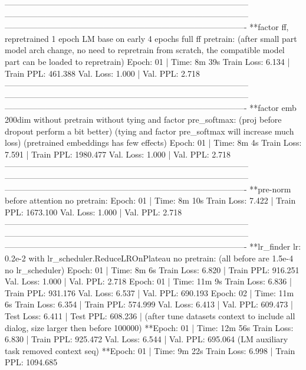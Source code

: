 \documentclass[letterpaper]{article} %
\begin{document}
\begin{CJK*}{UTF8}{gbsn}
-----------------------------------------------------------------------------------------
-----------------------------------------------------------------------------------------
----------------------------------------------------------------------------------------
**factor ff, repretrained 1 epoch LM base on early 4 epochs full ff pretrain:
(after small part model arch change, no need to repretrain from scratch,
the compatible model part can be loaded to repretrain)
Epoch: 01 | Time: 8m 39s
	Train Loss: 6.134 | Train PPL: 461.388
	 Val. Loss: 1.000 |  Val. PPL:   2.718
-----------------------------------------------------------------------------------------
-----------------------------------------------------------------------------------------
----------------------------------------------------------------------------------------
**factor emb 200dim without pretrain without tying and factor pre_softmax:
(proj before dropout perform a bit better)
(tying and factor pre_softmax will increase much loss)
(pretrained embeddings has few effects)
Epoch: 01 | Time: 8m 4s
	Train Loss: 7.591 | Train PPL: 1980.477
	 Val. Loss: 1.000 |  Val. PPL:   2.718
-----------------------------------------------------------------------------------------
-----------------------------------------------------------------------------------------
----------------------------------------------------------------------------------------
**pre-norm before attention no pretrain:
Epoch: 01 | Time: 8m 10s
	Train Loss: 7.422 | Train PPL: 1673.100
	 Val. Loss: 1.000 |  Val. PPL:   2.718
-----------------------------------------------------------------------------------------
-----------------------------------------------------------------------------------------
----------------------------------------------------------------------------------------
**lr_finder lr: 0.2e-2 with lr_scheduler.ReduceLROnPlateau no pretrain:
(all before are 1.5e-4 no lr_scheduler)
Epoch: 01 | Time: 8m 6s
	Train Loss: 6.820 | Train PPL: 916.251
	 Val. Loss: 1.000 |  Val. PPL:   2.718
Epoch: 01 | Time: 11m 9s
	Train Loss: 6.836 | Train PPL: 931.176
	 Val. Loss: 6.537 |  Val. PPL: 690.193
Epoch: 02 | Time: 11m 6s
	Train Loss: 6.354 | Train PPL: 574.999
	 Val. Loss: 6.413 |  Val. PPL: 609.473
| Test Loss: 6.411 | Test PPL: 608.236 |
(after tune datasets context to include all dialog, size larger then before 100000)
**Epoch: 01 | Time: 12m 56s
	Train Loss: 6.830 | Train PPL: 925.472
	 Val. Loss: 6.544 |  Val. PPL: 695.064
(LM auxiliary task removed context seq)
**Epoch: 01 | Time: 9m 22s
	Train Loss: 6.998 | Train PPL: 1094.685

\end{CJK*}
\end{document}
